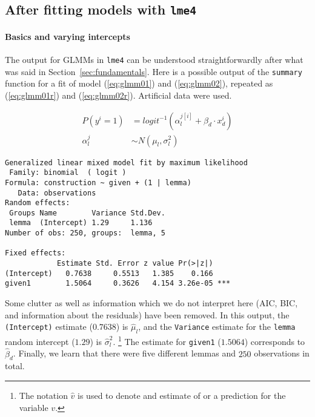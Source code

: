 \subsection{After fitting models with \texttt{lme4}}
\label{sec:afterfittingmodelswithlme4}

\paragraph{Basics and varying intercepts}

The output for GLMMs in \texttt{lme4} can be understood straightforwardly after what was said in Section~\ref{sec:fundamentals}.
Here is a possible output of the \texttt{summary} function for a fit of model (\ref{eq:glmm01}) and (\ref{eq:glmm02}), repeated as (\ref{eq:glmm01r}) and (\ref{eq:glmm02r}).
Artificial data were used.

\begin{align}
  P(y^i=1) & = logit^{-1}(\alpha_{l}^{j[i]}+\beta_d\cdot x_d^i)
  \label{eq:glmm01r} \\
  \alpha_l^j & \sim N(\mu_l,\sigma_l^2)
  \label{eq:glmm02r}
\end{align}

\vspace{0.5\baselineskip}

\begin{lstlisting}
Generalized linear mixed model fit by maximum likelihood 
 Family: binomial  ( logit )
Formula: construction ~ given + (1 | lemma)
   Data: observations
Random effects:
 Groups Name        Variance Std.Dev.
 lemma  (Intercept) 1.29     1.136   
Number of obs: 250, groups:  lemma, 5

Fixed effects:
            Estimate Std. Error z value Pr(>|z|)    
(Intercept)   0.7638     0.5513   1.385    0.166    
given1        1.5064     0.3626   4.154 3.26e-05 ***
\end{lstlisting}

Some clutter as well as information which we do not interpret here (AIC, BIC, and information about the residuals) have been removed.
In this output, the \texttt{(Intercept)} estimate ($0.7638$) is $\hat{\mu}_l$, and the \texttt{Variance} estimate for the \texttt{lemma} random intercept ($1.29$) is $\hat{\sigma}_l^2$.%
\footnote{The notation $\hat{v}$ is used to denote and estimate of or a prediction for the variable $v$.}
The estimate for \texttt{given1} ($1.5064$) corresponds to $\hat{\beta}_d$.
Finally, we learn that there were five different lemmas and $250$ observations in total.

